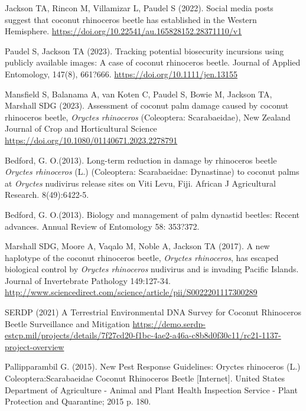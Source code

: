 \documentclass[11pt,english,letterpaper]{scrartcl}
\begin{document}
\begingroup
\renewcommand{\section}[2]{}%
\begin{thebibliography}{1}
	
 Jackson TA, Rincon M, Villamizar L, Paudel S (2022). Social media posts suggest that coconut rhinoceros beetle has established in the Western Hemisphere. \url{https://doi.org/10.22541/au.165828152.28371110/v1}
	
 Paudel S, Jackson TA (2023). Tracking potential biosecurity incursions using publicly available images: A case of coconut rhinoceros beetle. Journal of Applied Entomology, 147(8), 661?666. 
\url{https://doi.org/10.1111/jen.13155}
	
 Mansfield S, Balanama A, van Koten C, Paudel S, Bowie M, Jackson TA, Marshall SDG (2023). Assessment of coconut palm damage caused by coconut rhinoceros beetle, \textit{Oryctes rhinoceros} (Coleoptera: Scarabaeidae), New Zealand Journal of Crop and Horticultural Science \url{https://doi.org/10.1080/01140671.2023.2278791}
	
 Bedford, G. O.(2013). Long-term reduction in damage by rhinoceros beetle \textit{Oryctes rhinoceros} (L.) (Coleoptera: Scarabaeidae: Dynastinae) to coconut palms at \textit{Oryctes} nudivirus release sites on Viti Levu, Fiji. African J Agricultural Research. 8(49):6422-5. 

 Bedford, G. O.(2013). Biology and management of palm dynastid beetles: Recent advances. Annual Review of Entomology 58: 353?372. 

 Marshall SDG, Moore A, Vaqalo M, Noble A, Jackson TA (2017). A new haplotype of the coconut rhinoceros beetle, \textit{Oryctes rhinoceros}, has escaped biological control by \textit{Oryctes rhinoceros} nudivirus and is invading Pacific Islands. Journal of Invertebrate Pathology 149:127-34. 
\url{ http://www.sciencedirect.com/science/article/pii/S0022201117300289}

 SERDP (2021) A Terrestrial Environmental DNA Survey for Coconut Rhinoceros Beetle Surveillance and Mitigation
\url{https://demo.serdp-estcp.mil/projects/details/7f27cd20-f1bc-4ae2-a46a-c8b8d0f30c11/rc21-1137-project-overview}
	
 Pallipparambil G. (2015). New Pest Response Guidelines: Oryctes rhinoceros (L.) Coleoptera:Scarabaeidae Coconut Rhinoceros Beetle [Internet]. United States Department of Agriculture - Animal and Plant Health Inspection Service - Plant Protection and Quarantine; 2015 p. 180.


\end{thebibliography}
\end{document}

